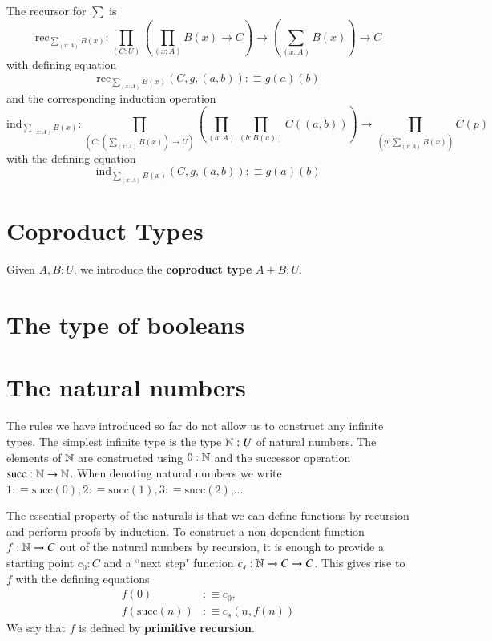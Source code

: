 \begin{definition}
    The recursor for $\sum$ is \begin{equation*}
        \text{rec}_{\sum_{(x:A)}B(x)}:\prod_{(C:U)}\left(\prod_{(x:A)}B(x)\rightarrow C\right)\rightarrow \left(\sum_{(x:A)}B(x)\right)\rightarrow C
    \end{equation*}
    with defining equation \begin{equation*}
        \text{rec}_{\sum_{(x:A)}B(x)}(C,g,(a,b)) :\equiv g(a)(b)
    \end{equation*}
    and the corresponding induction operation \begin{equation*}
        \text{ind}_{\sum_{(x:A)}B(x)}:\prod_{(C:(\sum_{(x:A)}B(x))\rightarrow U)}\left(\prod_{(a:A)}\prod_{(b:B(a))}C((a,b))\right)\rightarrow \prod_{(p:\sum_{(x:A)}B(x))}C(p)
    \end{equation*}
    with the defining equation \begin{equation*}
        \text{ind}_{\sum_{(x:A)}B(x)}(C,g,(a,b)) :\equiv g(a)(b)
    \end{equation*}
\end{definition}


\section{Coproduct Types}

Given $A,B : U$, we introduce the \textbf{coproduct type} $A+B:U$.

\section{The type of booleans}


\section{The natural numbers}


The rules we have introduced so far do not allow us to construct any infinite types. The simplest infinite type is the type $\mathbb N:U$ of natural numbers. The elements of $\mathbb N$ are constructed using $0:\mathbb N$ and the successor operation $\text{succ}:\mathbb N\rightarrow \mathbb N$. When denoting natural numbers we write $1 :\equiv \text{succ}(0), 2:\equiv \text{succ}(1),3:\equiv \text{succ}(2)$,...

The essential property of the naturals is that we can define functions by recursion and perform proofs by induction. To construct a non-dependent function $f:\mathbb N \rightarrow C$ out of the natural numbers by recursion, it is enough to provide a starting point $c_0:C$ and a ``next step" function $c_s:\mathbb N\rightarrow C\rightarrow C$. This gives rise to $f$ with the defining equations \begin{align*}
    f(0) &:\equiv c_0, \\
    f(\text{succ}(n)) &:\equiv c_s(n,f(n))
\end{align*}
We say that $f$ is defined by \textbf{primitive recursion}. 

